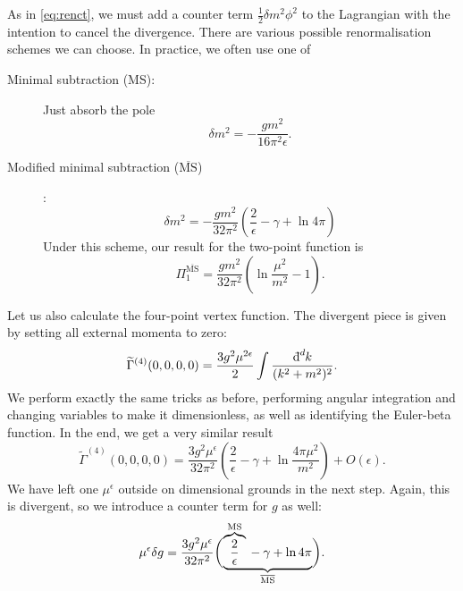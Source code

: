 As in \eqref{eq:renct}, we must add a counter term $\frac{1}{2} \delta m^2 \phi^2$ to the Lagrangian with the intention to cancel the divergence.
There are various possible renormalisation schemes we can choose. In practice, we often use one of
\begin{description}
  \item[Minimal subtraction (MS):]  Just absorb the pole
    \begin{equation}
      \delta m^2 = - \frac{g m^2}{16 \pi^2 \epsilon}.
    \end{equation}
  \item[Modified minimal subtraction ($\overline{\text{MS}}{}$)]:
    \begin{equation}
      \delta m^2 = - \frac{g m^2}{32 \pi^2} \left( \frac{2}{\epsilon} - \gamma + \ln 4 \pi \right)
    \end{equation}
    Under this scheme, our result for the two-point function is
    \begin{equation}
      \Pi_1^{\overline{\text{MS}}{}} = \frac{g m^2}{32 \pi^2} \left( \ln \frac{\mu^2}{m^2} - 1 \right).
    \end{equation}
\end{description}

Let us also calculate the four-point vertex function.
The divergent piece is given by setting all external momenta to zero:
\begin{equation}
  \widetilde{\Gamma}^{(4)} (0,0,0,0) = \frac{3 g^2 \mu^{2 \epsilon}}{2} \int \frac{\bdd[d]{k}}{(k^2 + m^2)^2}.
\end{equation}
We perform exactly the same tricks as before, performing angular integration and changing variables to make it dimensionless, as well as identifying the Euler-beta function.
In the end, we get a very similar result
\begin{equation}
  \widetilde{\Gamma}^{(4)} (0,0,0,0) = \frac{3 g^2 \mu^\epsilon}{32 \pi^2} \left( \frac{2}{\epsilon} - \gamma + \ln \frac{4 \pi \mu^2}{m^2} \right) + O(\epsilon).
\end{equation}
We have left one $\mu^\epsilon$ outside on dimensional grounds in the next step.
Again, this is divergent, so we introduce a counter term for $g$ as well:
\begin{equation}
  \label{eq:11-dg}
  \mu^\epsilon \delta g = \frac{3 g^2 \mu^{\epsilon}}{32 \pi^2} \biggl( \underbrace{ \overbrace{\frac{2}{\epsilon}}^{\mathclap{\text{MS}}} {} - \gamma + \ln 4 \pi }_{\mathclap{\overline{\text{MS}}{}}} \biggr).
\end{equation}

